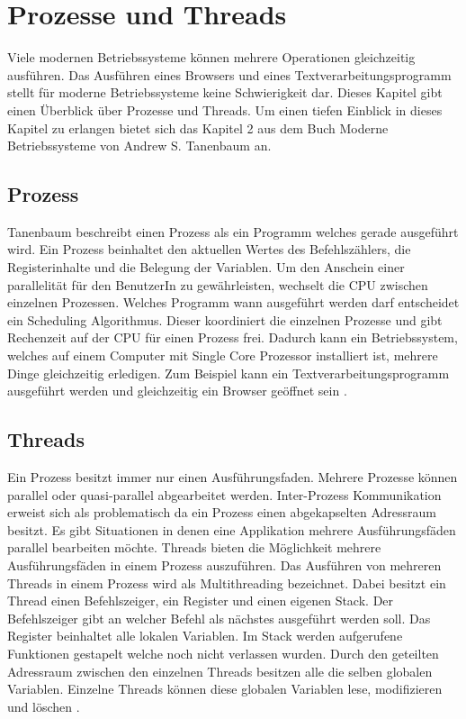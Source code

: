 \section{Prozesse und Threads}

Viele modernen Betriebssysteme können mehrere Operationen gleichzeitig ausführen. Das Ausführen eines Browsers und eines Textverarbeitungsprogramm stellt für moderne Betriebssysteme keine Schwierigkeit dar. Dieses Kapitel gibt einen Überblick über Prozesse und Threads. Um einen tiefen Einblick in dieses Kapitel zu erlangen bietet sich das Kapitel 2 aus dem Buch Moderne Betriebssysteme von Andrew S. Tanenbaum an. 

\subsection{Prozess}
\label{section: Prozess}
Tanenbaum beschreibt einen Prozess als ein Programm welches gerade ausgeführt wird. Ein Prozess beinhaltet den aktuellen Wertes des Befehlszählers, die Registerinhalte und die Belegung der Variablen. Um den Anschein einer parallelität für den BenutzerIn zu gewährleisten, wechselt die CPU zwischen einzelnen Prozessen.  Welches Programm wann ausgeführt werden darf entscheidet ein Scheduling Algorithmus. Dieser koordiniert die einzelnen Prozesse und gibt Rechenzeit auf der CPU für einen Prozess frei. Dadurch kann ein Betriebssystem, welches auf einem Computer mit Single Core Prozessor installiert ist, mehrere Dinge gleichzeitig erledigen. Zum Beispiel kann ein Textverarbeitungsprogramm ausgeführt werden und gleichzeitig ein Browser geöffnet sein \cite[p. 87]{tan09}.

\subsection{Threads}
\label{section: Threads}
Ein Prozess besitzt immer nur einen Ausführungsfaden. Mehrere Prozesse können parallel oder quasi-parallel abgearbeitet werden. Inter-Prozess Kommunikation erweist sich als problematisch da ein Prozess einen abgekapselten Adressraum besitzt. Es gibt Situationen in denen eine Applikation mehrere Ausführungsfäden parallel bearbeiten möchte. Threads bieten die Möglichkeit mehrere Ausführungsfäden in einem Prozess auszuführen. Das Ausführen von mehreren Threads in einem Prozess wird als Multithreading bezeichnet. Dabei besitzt ein Thread einen Befehlszeiger, ein Register und einen eigenen Stack. Der Befehlszeiger gibt an welcher Befehl als nächstes ausgeführt werden soll. Das Register beinhaltet alle lokalen Variablen. Im Stack werden aufgerufene Funktionen gestapelt welche noch nicht verlassen wurden. Durch den geteilten Adressraum zwischen den einzelnen Threads besitzen alle die selben globalen Variablen. Einzelne Threads können diese globalen Variablen lese, modifizieren und löschen \cite[p. 97]{tan09}. 

